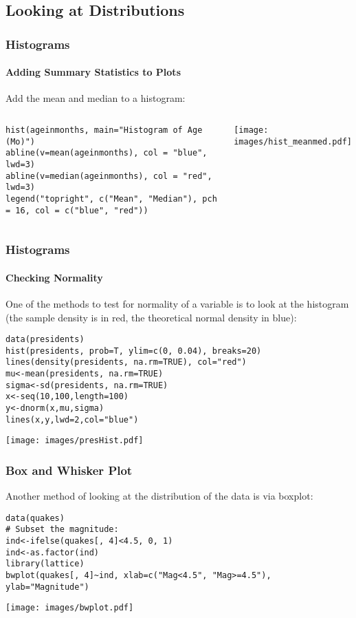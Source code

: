 \subsection{Looking at Distributions}

\begin{frame}[fragile]
\frametitle{Histograms}
  \framesubtitle{Adding Summary Statistics to Plots}
Add the mean and median to a histogram:
    \begin{columns}

\begin{lstlisting}
hist(ageinmonths, main="Histogram of Age (Mo)")
abline(v=mean(ageinmonths), col = "blue", lwd=3)
abline(v=median(ageinmonths), col = "red", lwd=3)
legend("topright", c("Mean", "Median"), pch = 16, col = c("blue", "red"))
\end{lstlisting}

\begin{center}
\texttt{[image: images/hist\_meanmed.pdf]}
\end{center}

\end{columns}
\end{frame}

\begin{frame}
\frametitle{Histograms}
\framesubtitle{Checking Normality}

One of the methods to test for normality of a variable is to look at the histogram (the sample density is in red, the theoretical normal density in blue):
  		\begin{lstlisting}
data(presidents)		
hist(presidents, prob=T, ylim=c(0, 0.04), breaks=20)
lines(density(presidents, na.rm=TRUE), col="red")
mu<-mean(presidents, na.rm=TRUE) 
sigma<-sd(presidents, na.rm=TRUE)
x<-seq(10,100,length=100) 
y<-dnorm(x,mu,sigma) 
lines(x,y,lwd=2,col="blue") 
		\end{lstlisting}

        \begin{center}
         \texttt{[image: images/presHist.pdf]}
        \end{center}
\end{frame}


\begin{frame}
\frametitle{Box and Whisker Plot}

Another method of looking at the distribution of the data is via boxplot:
  		\begin{lstlisting}
data(quakes)		
# Subset the magnitude:
ind<-ifelse(quakes[, 4]<4.5, 0, 1)
ind<-as.factor(ind)
library(lattice)
bwplot(quakes[, 4]~ind, xlab=c("Mag<4.5", "Mag>=4.5"), ylab="Magnitude")
		\end{lstlisting}

        \begin{center}
         \texttt{[image: images/bwplot.pdf]}
        \end{center}
\end{frame}

